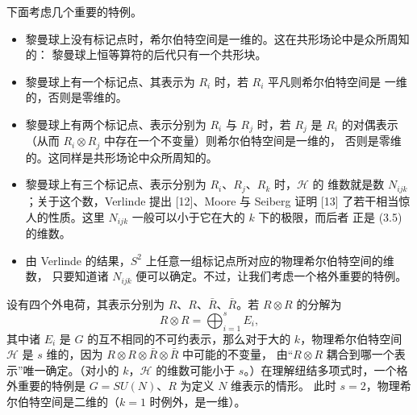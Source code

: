 \documentclass[11pt,a4paper]{article}
\begin{document}
下面考虑几个重要的特例。

\begin{itemize}
    \item[(i)] 黎曼球上没有标记点时，希尔伯特空间是一维的。这在共形场论中是众所周知的：
          黎曼球上恒等算符的后代只有一个共形块。
    \item[(ii)] 黎曼球上有一个标记点、其表示为 $R_i$ 时，若 $R_i$ 平凡则希尔伯特空间是
          一维的，否则是零维的。
    \item[(iii)] 黎曼球上有两个标记点、表示分别为 $R_i$ 与 $R_j$ 时，若 $R_j$ 是 $R_i$
          的对偶表示（从而 $R_i\otimes R_j$ 中存在一个不变量）则希尔伯特空间是一维的，
          否则是零维的。这同样是共形场论中众所周知的。
    \item[(iv)] 黎曼球上有三个标记点、表示分别为 $R_i$、$R_j$、$R_k$ 时，$\mathcal{H}$ 的
          维数就是数 $N_{ijk}$；关于这个数，Verlinde 提出 [12]、Moore 与 Seiberg 证明 [13]
          了若干相当惊人的性质。这里 $N_{ijk}$ 一般可以小于它在大的 $k$ 下的极限，而后者
          正是 (3.5) 的维数。
    \item[(v)] 由 Verlinde 的结果，$S^2$ 上任意一组标记点所对应的物理希尔伯特空间的维数，
          只要知道诸 $N_{ijk}$ 便可以确定。不过，让我们考虑一个格外重要的特例。
\end{itemize}

设有四个外电荷，其表示分别为 $R$、$R$、$\bar{R}$、$\bar{R}$。若 $R\otimes R$ 的分解为
\begin{equation}
    R\otimes R=\bigoplus_{i=1}^{s}E_i,
    \tag{3.6}
\end{equation}
其中诸 $E_i$ 是 $G$ 的互不相同的不可约表示，那么对于大的 $k$，物理希尔伯特空间
$\mathcal{H}$ 是 $s$ 维的，因为 $R\otimes R\otimes\bar{R}\otimes\bar{R}$ 中可能的不变量，
由“$R\otimes R$ 耦合到哪一个表示”唯一确定。（对小的 $k$，$\mathcal{H}$ 的维数可能小于
$s$。）在理解纽结多项式时，一个格外重要的特例是 $G=SU(N)$、$R$ 为定义 $N$ 维表示的情形。
此时 $s=2$，物理希尔伯特空间是二维的（$k=1$ 时例外，是一维）。

\end{document}
